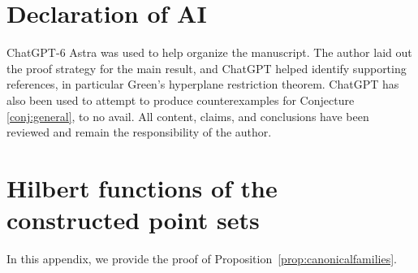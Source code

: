\documentclass[11pt]{amsart}
\theoremstyle{definition}
\numberwithin{equation}{section}
\begin{document}
\section*{Declaration of AI}
ChatGPT-6 Astra was used to help organize the manuscript. The author laid out the proof strategy for the main result, and ChatGPT helped identify supporting references, in particular Green's hyperplane restriction theorem. ChatGPT has also been used to attempt to produce counterexamples for Conjecture \ref{conj:general}, to no avail.
All content, claims, and conclusions have been reviewed and remain the responsibility of the author.

\appendix
\section{Hilbert functions of the constructed point sets}\label{app:hilbertfunctions}
In this appendix, we provide the proof of Proposition~\ref{prop:canonicalfamilies}.
\end{document}
